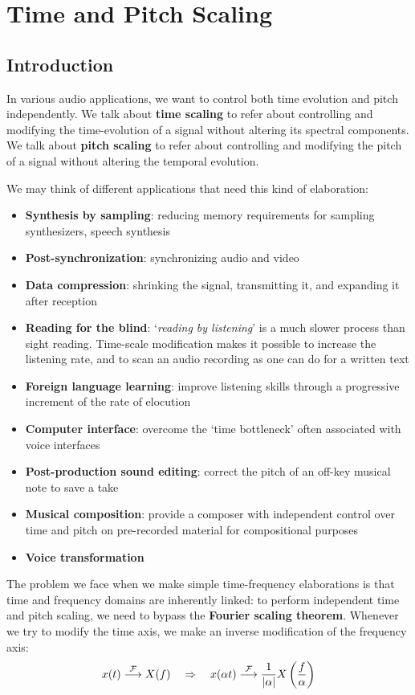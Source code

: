 \section{Time and Pitch Scaling}

\subsection{Introduction}
In various audio applications, we want to control both time evolution and pitch independently.
We talk about \textbf{time scaling} to refer about controlling and modifying the time-evolution of a signal without altering its spectral components.
We talk about \textbf{pitch scaling} to refer about controlling and modifying the pitch of a signal without altering the temporal evolution.

We may think of different applications that need this kind of elaboration:

\begin{itemize}
    \item \textbf{Synthesis by sampling}: reducing memory requirements for sampling synthesizers, speech synthesis
    \item \textbf{Post-synchronization}: synchronizing audio and video
    \item \textbf{Data compression}: shrinking the signal, transmitting it, and expanding it after reception
    \item \textbf{Reading for the blind}: ‘\textit{reading by listening}’ is a much slower process than sight reading.
    Time-scale modification makes it possible to increase the listening rate, and to scan an audio recording as one can do for a written text
    \item \textbf{Foreign language learning}: improve listening skills through a progressive increment of the rate of elocution
    \item \textbf{Computer interface}: overcome the ‘time bottleneck’ often associated with voice interfaces
    \item \textbf{Post-production sound editing}: correct the pitch of an off-key musical note to save a take 
    \item \textbf{Musical composition}: provide a composer with independent control over time and pitch on pre-recorded material for compositional purposes
    \item \textbf{Voice transformation}
\end{itemize}

The problem we face when we make simple time-frequency elaborations is that time and frequency domains are inherently linked: to perform independent time and pitch scaling, we need to bypass the \textbf{Fourier scaling theorem}.
Whenever we try to modify the time axis, we make an inverse modification of the frequency axis:
\[
x(t) \overset{\mathcal{F}}{\longrightarrow} X(f) \quad \Rightarrow \quad x(\alpha t) \overset{\mathcal{F}}{\longrightarrow} \frac{1}{\abs{\alpha}} X\left(\frac{f}{\alpha}\right)
\]

